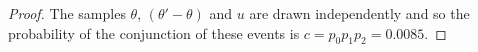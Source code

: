 \documentclass{article}
\begin{document}
\begin{proof}
  The samples $\theta$, $(\theta'-\theta)$
  and $u$ are drawn independently and so the probability of the conjunction of these events is
  $c = p_0 p_1 p_2 = 0.0085$.
\end{proof}




\end{document}
